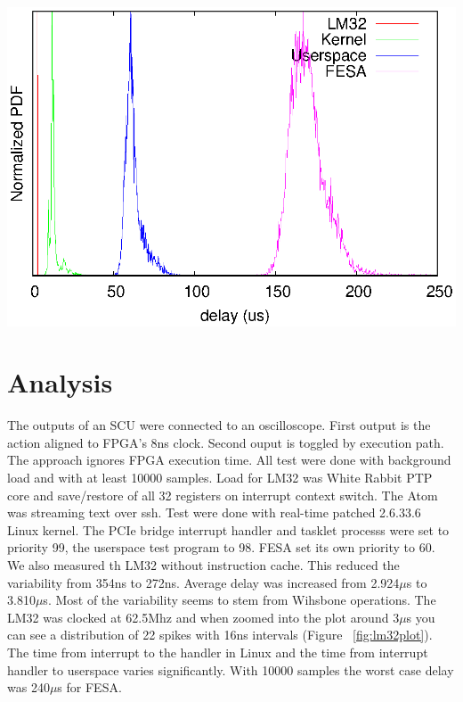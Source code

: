 \documentclass[25pt,halfparskip-,pagesize]{scrartcl}
\begin{document}
\begin{multicols*}{3}
\includegraphics[width=\columnwidth]{../images/WEPD48f1}
\label{fig:delaycomparison}

\section{Analysis}
The outputs of an SCU were connected to an oscilloscope.
First output is the action aligned to FPGA's 8ns clock.
Second ouput is toggled by execution path. The approach
ignores FPGA execution time.
All test were done with background load and with at least
10000 samples. Load for LM32 was White Rabbit PTP core and
save/restore of all 32 registers on interrupt context switch.
The Atom was streaming text over ssh.
Test were done with real-time patched 2.6.33.6 Linux kernel.
The PCIe bridge interrupt handler and tasklet processs were
set to priority 99, the userspace test program to 98. FESA
set its own priority to 60.
We also measured th LM32 without instruction cache. This reduced
the variability from 354ns to 272ns. Average delay was increased
from 2.924$\mu$s to 3.810$\mu$s. Most of the variability seems
to stem from Wihsbone operations.
The LM32 was clocked at 62.5Mhz and when zoomed into the plot
around 3$\mu$s you can see a distribution of 22 spikes with 16ns
intervals (Figure ~\ref{fig:lm32plot}).
The time from interrupt to the handler in Linux and the time
from interrupt handler to userspace varies significantly.
With 10000 samples the worst case delay was 240$\mu$s for FESA.


\end{multicols*}
\end{document}
